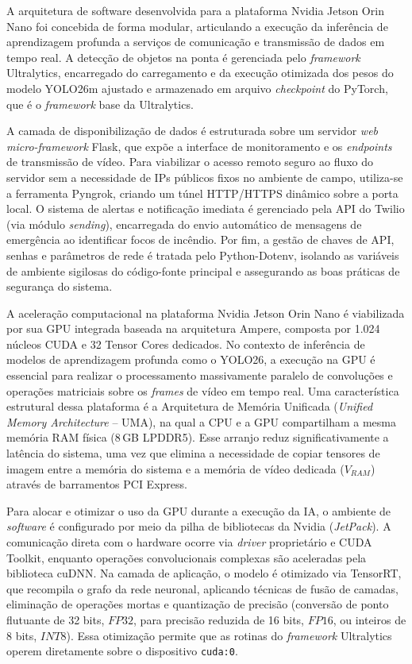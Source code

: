 A arquitetura de software desenvolvida para a plataforma Nvidia Jetson Orin Nano foi concebida de forma modular, articulando a execução da inferência de aprendizagem profunda a serviços de comunicação e transmissão de dados em tempo real. A detecção de objetos na ponta é gerenciada pelo \textit{framework} Ultralytics, encarregado do carregamento e da execução otimizada dos pesos do
modelo YOLO26m ajustado e armazenado em arquivo \textit{checkpoint} do PyTorch, que é o \textit{framework} base da Ultralytics.

A camada de disponibilização de dados é estruturada sobre um servidor
\textit{web micro-framework} Flask, que expõe a interface de monitoramento e os
\textit{endpoints} de transmissão de vídeo. Para viabilizar o acesso remoto seguro ao fluxo do servidor sem a necessidade de IPs públicos fixos no ambiente de campo, utiliza-se a ferramenta Pyngrok, criando um túnel HTTP/HTTPS dinâmico sobre a porta local. O sistema de alertas e notificação imediata é gerenciado pela API do Twilio (via módulo \textit{sending}), encarregada do envio automático de mensagens de emergência ao identificar focos de incêndio. Por fim, a gestão de chaves de API, senhas e parâmetros de rede é tratada pelo Python-Dotenv, isolando as variáveis de ambiente sigilosas do código-fonte principal e assegurando as boas práticas de segurança do sistema.

A aceleração computacional na plataforma Nvidia Jetson Orin Nano é viabilizada por sua GPU integrada baseada na arquitetura Ampere, composta por 1.024 núcleos CUDA e 32 Tensor Cores dedicados. No contexto de inferência de modelos de aprendizagem profunda como o YOLO26, a execução na GPU é essencial para realizar o processamento massivamente paralelo de convoluções e operações
matriciais sobre os \textit{frames} de vídeo em tempo real. Uma característica estrutural dessa plataforma é a Arquitetura de Memória Unificada (\textit{Unified Memory Architecture} -- UMA), na qual a CPU e a GPU compartilham a mesma memória RAM física (8\,GB LPDDR5). Esse arranjo reduz significativamente a latência do sistema, uma vez que elimina a necessidade de copiar tensores de
imagem entre a memória do sistema e a memória de vídeo dedicada ($V_{RAM}$) através de barramentos PCI Express.

Para alocar e otimizar o uso da GPU durante a execução da IA, o ambiente de \textit{software} é configurado por meio da pilha de bibliotecas da Nvidia (\textit{JetPack}). A comunicação direta com o hardware ocorre via \textit{driver} proprietário e CUDA Toolkit, enquanto operações convolucionais complexas são aceleradas pela biblioteca cuDNN. Na camada de aplicação, o modelo é otimizado via TensorRT, que recompila o grafo da rede neuronal, aplicando técnicas de fusão de camadas, eliminação de operações mortas e quantização de precisão (conversão de ponto flutuante de 32 bits, $FP32$, para precisão reduzida de 16 bits, $FP16$, ou inteiros de 8 bits, $INT8$). Essa
otimização permite que as rotinas do \textit{framework} Ultralytics operem diretamente sobre o dispositivo \texttt{cuda:0}.

